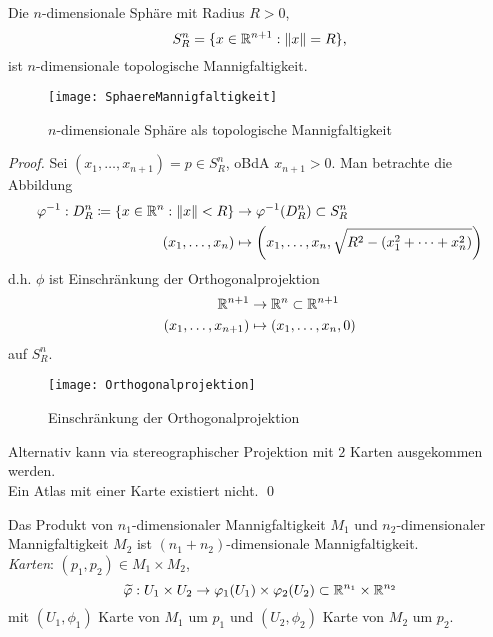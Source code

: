 \begin{example}
\begin{enumerate}
    \begin{minipage}{.45\textwidth}
      \item Die \( n \)-dimensionale Sphäre mit Radius \( R > 0 \),
      \begin{equation*}
        S^n_R = \{ x \in \mathbb{R}^{n+1} : \Vert x \Vert = R \}\text{,}
      \end{equation*}
      ist \( n \)-dimensionale topologische Mannigfaltigkeit.
    \end{minipage}
    \hfill
    \begin{minipage}{.45\textwidth}
      \begin{figure}[H]
        \texttt{[image: SphaereMannigfaltigkeit]}
        \caption{\( n \)-dimensionale Sphäre als topologische Mannigfaltigkeit}
      \end{figure}
    \end{minipage}
    \begin{proof}
      Sei \( (x_1, \dots, x_{n+1}) = p \in S^n_R \), oBdA \( x_{n+1} > 0 \). Man betrachte die Abbildung
      \begin{align*}
	      \varphi^{-1} : D^n_R \coloneqq \left \{ x \in \mathbb{R}^n : \Vert x \Vert < R \right \} &\to \varphi^{-1}(D^n_R) \subset S^n_R \\
          (x_1, \dots, x_n) &\mapsto \left(x_1, \dots, x_n, \sqrt{R^2-(x_1^2 + \cdots + x_n^2)}\right)
      \end{align*}
      d.h. \( \phi \) ist Einschränkung der Orthogonalprojektion
      \begin{align*}
        \mathbb{R}^{n+1} &\to \mathbb{R}^n \subset \mathbb{R}^{n+1} \\
          (x_1, \dots, x_{n+1}) &\mapsto (x_1, \dots, x_n, 0)
      \end{align*}
      auf \( S_R^n \).
      \begin{figure}[H]
        \texttt{[image: Orthogonalprojektion]}
        \caption{Einschränkung der Orthogonalprojektion}
      \end{figure}
      Alternativ kann via stereographischer Projektion mit \( 2 \) Karten ausgekommen werden. \\
      Ein Atlas mit einer Karte existiert nicht. \qed{}
    \end{proof}
    \item Das Produkt von \( n_1 \)-dimensionaler Mannigfaltigkeit \( M_1 \) und \( n_2 \)-dimensionaler Mannigfaltigkeit \( M_2 \) ist \( (n_1+n_2) \)-dimensionale Mannigfaltigkeit. \\
    \emph{Karten}: \( (p_1, p_2) \in M_1 \times M_2 \),
    \begin{equation*}
      \widetilde{\varphi} : U_1 \times U_2 \to \varphi_1(U_1) \times \varphi_2(U_2) \subset \mathbb{R}^{n_1} \times \mathbb{R}^{n_2}
    \end{equation*}
    mit \( (U_1, \phi_1) \) Karte von \( M_1 \) um \( p_1 \) und \( (U_2, \phi_2) \) Karte von \( M_2 \) um \( p_2 \).
  \end{enumerate}
\end{example}

